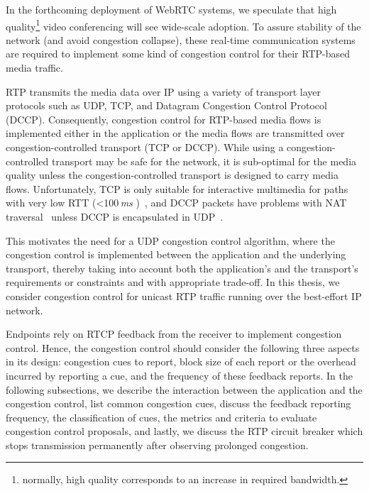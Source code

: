 In the forthcoming deployment of WebRTC systems, we speculate that high
quality\footnote{normally, high quality corresponds to an increase in required
bandwidth.} video conferencing will see wide-scale adoption. To assure
stability of the network (and avoid congestion collapse), these real-time
communication systems are required to implement some kind of congestion
control for their RTP-based media traffic.

RTP transmits the media data over IP using a variety of transport layer
protocols such as UDP, TCP, and Datagram Congestion Control Protocol (DCCP).
Consequently, congestion control for RTP-based media flows is implemented
either in the application or the media flows are transmitted over
congestion-controlled transport (TCP or DCCP). While using a congestion-controlled 
transport may be safe for the network, it is sub-optimal for the
media quality unless the congestion-controlled transport is designed to carry
media flows. Unfortunately, TCP is only suitable for interactive multimedia
for paths with very low RTT (<100\,\emph{ms} )~\cite{Brosh:tcp-real-time}, and
DCCP packets have problems with NAT traversal~\cite{schier:DCCP} unless DCCP is
encapsulated in UDP~\cite{RFC6773}.

This motivates the need for a UDP congestion control algorithm, where the
congestion control is implemented between the application and the
underlying transport, thereby taking into
account both the application's and the transport's requirements or constraints
and with appropriate trade-off. In this thesis, we consider congestion
control for unicast RTP traffic running over the best-effort IP network.


Endpoints rely on RTCP feedback from the receiver to implement congestion
control. Hence, the congestion control should consider the following three aspects
in its design: congestion cues to report, block size of each report or the
overhead incurred by reporting a cue, and the frequency of these feedback
reports. In the following subsections, we describe the interaction between the
application and the congestion control, list common congestion cues, discuss
the feedback reporting frequency, the classification of cues, the metrics and
criteria to evaluate congestion control proposals, and lastly, we discuss the
RTP circuit breaker which stops transmission permanently after observing
prolonged congestion.

